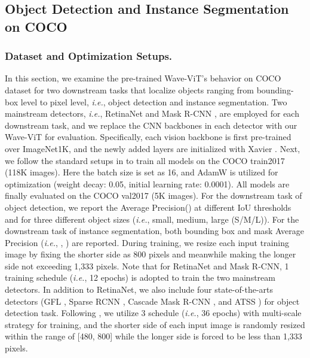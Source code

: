\documentclass[runningheads]{llncs}
\begin{document}
\subsection{Object Detection and Instance Segmentation on COCO}
\subsubsection{Dataset and Optimization Setups.} In this section, we examine the pre-trained Wave-ViT's behavior on COCO dataset for two downstream tasks that localize objects ranging from bounding-box level to pixel level, \emph{i.e.}, object detection and instance segmentation. Two mainstream detectors, \emph{i.e.}, RetinaNet \cite{lin2017focal} and Mask R-CNN \cite{he2017mask}, are employed for each downstream task, and we replace the CNN backbones in each detector with our Wave-ViT for evaluation. Specifically, each vision backbone is first pre-trained over ImageNet1K, and the newly added layers are initialized with Xavier \cite{glorot2010understanding}. Next, we follow the standard setups in \cite{liu2021swin} to train all models on the COCO train2017 (118K images). Here the batch size is set as 16, and AdamW \cite{loshchilov2017decoupled} is utilized for optimization (weight decay: 0.05, initial learning rate: 0.0001). All models are finally evaluated on the COCO val2017 (5K images). For the downstream task of object detection, we report the Average Precision() at different IoU thresholds and for three different object sizes (\emph{i.e.}, small, medium, large (S/M/L)). For the downstream task of instance segmentation, both bounding box and mask Average Precision (\emph{i.e.}, , ) are reported. During training, we resize each input training image by fixing the shorter side as 800 pixels and meanwhile making the longer side not exceeding 1,333 pixels. Note that for RetinaNet and Mask R-CNN, 1  training schedule (\emph{i.e.}, 12 epochs) is adopted to train the two mainstream detectors. In addition to RetinaNet, we also include four state-of-the-arts detectors (GFL \cite{li2020generalized}, Sparse RCNN \cite{sun2021sparse}, Cascade Mask R-CNN \cite{cai2018cascade}, and ATSS \cite{zhang2020bridging}) for object detection task. Following \cite{liu2021swin,wang2021pvtv2}, we utilize 3  schedule (\emph{i.e.}, 36 epochs) with multi-scale strategy for training, and the shorter side of each input image is randomly resized within the range of [480, 800] while the longer side is forced to be less than 1,333 pixels.
\end{document}
